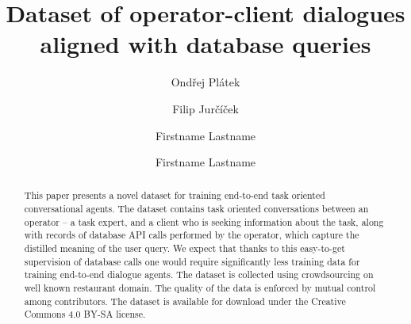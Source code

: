 \documentclass[runningheads,a4paper]{llncs}
\def\OP#1{#1}  %
\begin{document}


\title{Dataset of operator-client dialogues aligned with database queries}

\author{Ondřej Plátek \and Filip Jurčíček}

\iftrue %
\author{Firstname Lastname \and Firstname Lastname }
\fi
			
\maketitle

\begin{abstract}
    This paper presents a novel dataset for training end-to-end task oriented conversational agents.
    The dataset contains task oriented conversations between an operator – a task expert, and a client who is seeking information about the task, along with records of database API calls performed by the operator, which capture the distilled meaning of the user query.
    We expect that thanks to this easy-to-get supervision of database calls one would require significantly less training data for training end-to-end dialogue agents.
 	The dataset is collected using crowdsourcing on well known restaurant domain.
    The quality of the data is enforced by mutual control among contributors.  %
    The dataset is available for download under the Creative Commons 4.0 BY-SA license.
\end{abstract}

\vspace{-1.00em}
\vspace{-1.00em}
\end{document}
